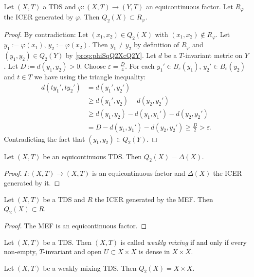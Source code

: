 \begin{theorem}
  Let $(X,T)$ a TDS and $\varphi : (X,T) \to (Y,T)$ an equicontinuous factor.
  Let $R_\varphi$ the ICER generated by $\varphi$. Then $Q_2(X) \subset R_\varphi$.
\end{theorem}
\begin{proof}
  By contradiction: Let $(x_1,x_2) \in Q_2(X)$ with $(x_1,x_2) \notin R_\varphi$.
  Let $y_1 := \varphi (x_1)$, $y_2 := \varphi (x_2)$.
  Then $y_1 \neq y_2$ by definition of $R_\varphi$ and $(y_1, y_2) \in Q_2 (Y)$ by \cref{prop:phiSqQ2XcQ2Y}.
  Let $d$ be a $T$-invariant metric on $Y$. Let $D := d(y_1, y_2) > 0$.
  Choose $\varepsilon = \frac{D}{4}$.
  For each $y_1' \in B_\varepsilon(y_1)$, $y_2' \in B_\varepsilon(y_2)$ and $t \in T$ we have using the triangle inequality:
  \begin{equation*}
    \begin{split}
      d(ty_1', ty_2') &= d(y_1', y_2') \\
      &\geq  d(y_1', y_2) - d(y_2, y_2')  \\
      &\geq d (y_1, y_2) - d(y_1, y_1')  - d(y_2, y_2')  \\
      &= D - d(y_1, y_1') - d(y_2, y_2') \geq \frac{D}{2} > \varepsilon.
    \end{split}
  \end{equation*}
  Contradicting the fact that $(y_1, y_2) \in Q_2(Y)$.
\end{proof}
\begin{corollary}
 Let $(X, T)$ be an equicontinuous TDS.
  Then $Q_2(X) = \Delta(X)$.
\end{corollary}
\begin{proof}
  $I : (X,T) \to (X,T)$ is an equicontinuous factor and $\Delta (X)$ the ICER generated by it.
  \end{proof}
\begin{corollary}
 Let $(X, T)$ be a TDS and $R$ the ICER generated by the MEF.
  Then $Q_2(X) \subset R$.
\end{corollary}
\begin{proof}
  The MEF is an equicontinuous factor.
  \end{proof}
  \begin{definition}
    Let $(X,T)$ be a TDS. Then $(X,T)$ is called \emph{weakly mixing} if and only if every non-empty, $T$-invariant and open $U\subset X \times X$ is dense in $X \times X$.
  \end{definition}
  \begin{proposition}
    Let $(X,T)$ be a weakly mixing TDS. Then $Q_2(X) = X \times X$.
  \end{proposition}
